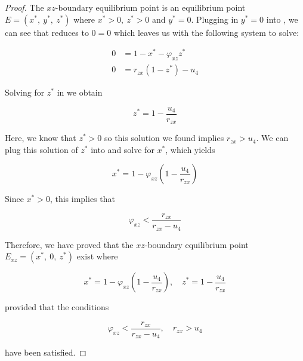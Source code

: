 \begin{proof}
    The $xz$-boundary equilibrium point is an equilibrium point $E=\left(x^*,\ y^*,\ z^*\right)$ where $x^*>0,\ z^*>0$ and $y^*=0$. Plugging in $y^*=0$ into , we can see that  reduces to $0=0$ which leaves us with the following system to solve:

    \begin{subequations}\label{system:xz-boundary}
        \begin{align}
            0 &= 1-x^*-\varphi_{xz}z^* \label{eq:xz-boundary-x}\\
            0 &= r_{zx}\left(1-z^*\right)-u_4 \label{eq:xz-boundary-z}
        \end{align}
    \end{subequations}

    Solving for $z^*$ in  we obtain
    
    \begin{equation*}
        z^*=1-\frac{u_4}{r_{zx}}
    \end{equation*}
    
    Here, we know that $z^*>0$ so this solution we found implies $r_{zx}>u_4$. We can plug this solution of $z^*$ into  and solve for $x^*$, which yields 
    
    \begin{equation*}
        x^*=1-\varphi_{xz}\left(1-\frac{u_4}{r_{zx}}\right)
    \end{equation*}
    
    Since $x^*>0$, this implies that
    
    \begin{equation*}
        \varphi_{xz}<\frac{r_{zx}}{r_{zx}-u_4}
    \end{equation*}
    
    Therefore, we have proved that the $xz$-boundary equilibrium point $E_{xz}=\left(x^*,\ 0,\ z^*\right)$ exist where 
    
    \begin{equation*}
        x^*=1-\varphi_{xz}\left(1-\frac{u_4}{r_{zx}}\right),\quad z^*=1-\frac{u_4}{r_{zx}}
    \end{equation*}
    
    provided that the conditions
    
    \begin{equation*}
        \varphi_{xz}<\frac{r_{zx}}{r_{zx}-u_4},\quad r_{zx}>u_4
    \end{equation*}
    
    have been satisfied.
\end{proof}

